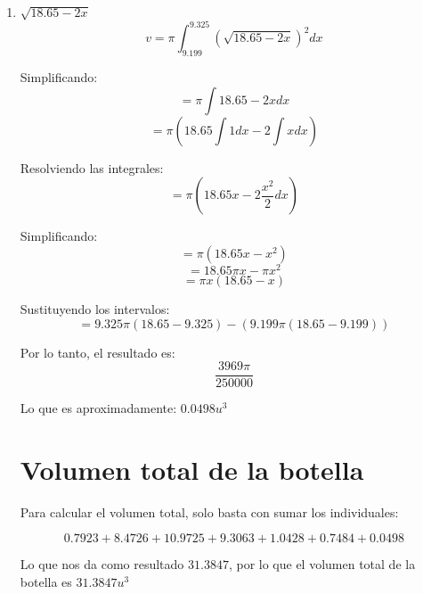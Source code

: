 \documentclass{article}
\begin{document}
\begin{enumerate}
    \pagebreak
    \item $\sqrt{18.65 -2 x}$
    $$ v = \pi \int_{9.199}^{9.325} (\sqrt{18.65 -2 x})^2 dx $$
    
    Simplificando:
    $$ = \pi \int 18.65 -2x dx $$
    $$ = \pi (18.65 \int 1 dx - 2 \int x dx) $$
    
    Resolviendo las integrales:
    $$ = \pi (18.65x - 2 \frac{x^2}{2} dx) $$
    
    Simplificando:
    $$ = \pi (18.65x - x^2) $$
    $$ = 18.65\pi x - \pi x^2 $$
    $$ = \pi x (18.65 - x)  $$
    
    Sustituyendo los intervalos:
    $$ = 9.325 \pi  (18.65 - 9.325) - (9.199 \pi (18.65 - 9.199))  $$
    
    Por lo tanto, el resultado es:
    $$ \frac{3969\pi}{250000} $$
    
    Lo que es aproximadamente: $0.0498 u^3$
    
    \section*{Volumen total de la botella}
    
    Para calcular el volumen total, solo basta con sumar los individuales:
    
    $$ 0.7923 + 8.4726 + 10.9725 + 9.3063 + 1.0428 + 0.7484 + 0.0498 $$
    
    Lo que nos da como resultado $31.3847$, por lo que el volumen total de la botella es $31.3847 u^3$
    
\end{enumerate}
\end{document}
